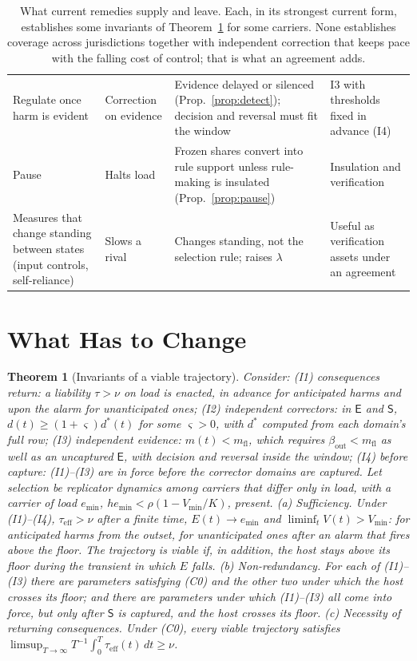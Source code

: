 \documentclass[letterpaper]{article} %
\newtheorem{theorem}{Theorem}
\theoremstyle{definition}
\newcommand{\dE}{\mathsf{E}}
\newcommand{\dS}{\mathsf{S}}
\newcommand{\Vmin}{V_{\min}}
\newcommand{\mfl}{m_{\mathrm{fl}}}
\newcommand{\taueff}{\tau_{\mathrm{eff}}}
\begin{document}
\begin{table}[t]
\begin{tabular}{@{}>{\raggedright\arraybackslash}p{3.2cm}>{\raggedright\arraybackslash}p{3.9cm}>{\raggedright\arraybackslash}p{6.4cm}>{\raggedright\arraybackslash}p{3.6cm}@{}}
Regulate once harm is evident & Correction on evidence & Evidence delayed or silenced (Prop.~\ref{prop:detect}); decision and reversal must fit the window & I3 with thresholds fixed in advance (I4) \\
Pause & Halts load & Frozen shares convert into rule support unless rule-making is insulated (Prop.~\ref{prop:pause}) & Insulation and verification \\
Measures that change standing between states (input controls, self-reliance) & Slows a rival & Changes standing, not the selection rule; raises $\lambda$ & Useful as verification assets under an agreement \\
\bottomrule
\end{tabular}
\caption{What current remedies supply and leave. Each, in its strongest current form, establishes some invariants of Theorem~\ref{thm:invariants} for some carriers. None establishes coverage across jurisdictions together with independent correction that keeps pace with the falling cost of control; that is what an agreement adds.}
\label{tab:remedies}
\end{table}

\section{What Has to Change}\label{sec:change}

\begin{theorem}[Invariants of a viable trajectory]\label{thm:invariants}
Consider: (I1) \emph{consequences return}: a liability $\tau>\nu$ on load is enacted, in advance for anticipated harms and upon the alarm for unanticipated ones; (I2) \emph{independent correctors}: in $\dE$ and $\dS$, $d(t)\ge(1+\varsigma)d^\ast(t)$ for some $\varsigma>0$, with $d^\ast$ computed from each domain's full row; (I3) \emph{independent evidence}: $m(t)<\mfl$, which requires $\beta_{\mathrm{out}}<\mfl$ as well as an uncaptured $\dE$, with decision and reversal inside the window; (I4) \emph{before capture}: (I1)--(I3) are in force before the corrector domains are captured. Let selection be replicator dynamics among carriers that differ only in load, with a carrier of load $e_{\min}$, $he_{\min}<\rho(1-\Vmin/K)$, present.
(a) \emph{Sufficiency.} Under (I1)--(I4), $\taueff>\nu$ after a finite time, $E(t)\to e_{\min}$ and $\liminf_tV(t)>\Vmin$: for anticipated harms from the outset, for unanticipated ones after an alarm that fires above the floor. The trajectory is viable if, in addition, the host stays above its floor during the transient in which $E$ falls.
(b) \emph{Non-redundancy.} For each of (I1)--(I3) there are parameters satisfying (C0) and the other two under which the host crosses its floor; and there are parameters under which (I1)--(I3) all come into force, but only after $\dS$ is captured, and the host crosses its floor.
(c) \emph{Necessity of returning consequences.} Under (C0), every viable trajectory satisfies $\limsup_{T\to\infty}T^{-1}\!\int_0^T\taueff(t)\,dt\ge\nu$.
\end{theorem}
\end{document}
